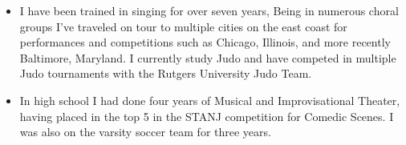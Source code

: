 \documentclass[12pt,a4paper,sans]{moderncv} %
\begin{document}
\begin{itemize}


\item{I have been trained in singing for over seven years, Being in numerous choral groups I've traveled on tour to multiple cities on the east coast for performances and competitions such as Chicago, Illinois, and more recently Baltimore, Maryland. I currently study Judo and have competed in multiple Judo tournaments with the Rutgers University Judo Team.} 

\item{In high school I had done four years of Musical and Improvisational Theater, having placed in the top 5 in the STANJ competition for Comedic Scenes. I was also on the varsity soccer team for three years.}


\end{itemize}


\nocite{*}

         
\end{document}
